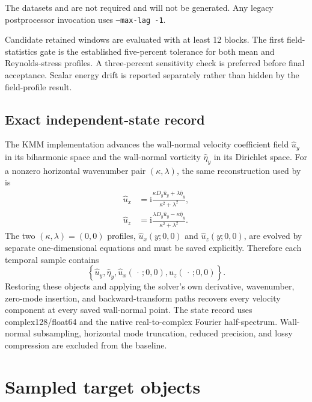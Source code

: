 \documentclass[11pt]{article}
\newcommand{\ii}{\mathrm{i}}
\begin{document}
The datasets  and
 are not required and will not be generated.  Any
legacy postprocessor invocation uses \texttt{--max-lag -1}.

Candidate retained windows are evaluated with at least 12 blocks.  The first
field-statistics gate is the established five-percent tolerance for both mean
and Reynolds-stress profiles.  A three-percent sensitivity check is preferred
before final acceptance.  Scalar energy drift is reported separately rather
than hidden by the field-profile result.

\subsection{Exact independent-state record}

The KMM implementation advances the wall-normal velocity coefficient field
$\widehat{u}_y$ in its biharmonic space and the wall-normal vorticity
$\widehat{\eta}_y$ in its Dirichlet space.  For a nonzero horizontal
wavenumber pair $(\kappa,\lambda)$, the same reconstruction used by
 is
\begin{align}
  \widehat{u}_x
  &=\ii\frac{\kappa D_y\widehat{u}_y+
                    \lambda\widehat{\eta}_y}
                   {\kappa^2+\lambda^2},\\
  \widehat{u}_z
  &=\ii\frac{\lambda D_y\widehat{u}_y-
                    \kappa\widehat{\eta}_y}
                   {\kappa^2+\lambda^2}.
  \label{eq:state_reconstruction}
\end{align}
The two $(\kappa,\lambda)=(0,0)$ profiles,
$\widehat{u}_x(y;0,0)$ and $\widehat{u}_z(y;0,0)$, are evolved by separate
one-dimensional equations and must be saved explicitly.  Therefore each
temporal sample contains
\[
  \left\{\widehat{u}_y,\widehat{\eta}_y,
  \widehat{u}_x(\,\cdot\,;0,0),
  \widehat{u}_z(\,\cdot\,;0,0)\right\}.
\]
Restoring these objects and applying the solver's own derivative, wavenumber,
zero-mode insertion, and backward-transform paths recovers every velocity
component at every saved wall-normal point.  The state record uses
complex128/float64 and the native real-to-complex Fourier half-spectrum.
Wall-normal subsampling, horizontal mode truncation, reduced precision, and
lossy compression are excluded from the baseline.

\section{Sampled target objects}
\end{document}

